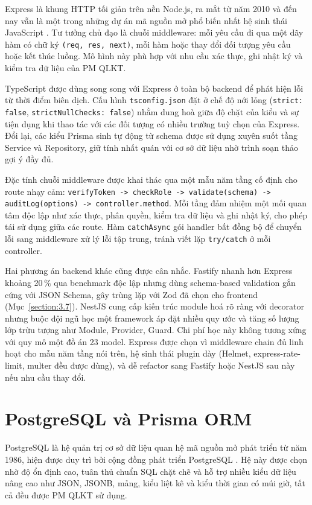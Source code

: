 \documentclass[../DoAn.tex]{subfiles}
\begin{document}
Express là khung HTTP tối giản trên nền Node.js, ra mắt từ năm 2010 và đến nay vẫn là một trong những dự án mã nguồn mở phổ biến nhất hệ sinh thái JavaScript \cite{expressdocs}. Tư tưởng chủ đạo là chuỗi middleware: mỗi yêu cầu đi qua một dãy hàm có chữ ký \texttt{(req, res, next)}, mỗi hàm hoặc thay đổi đối tượng yêu cầu hoặc kết thúc luồng. Mô hình này phù hợp với nhu cầu xác thực, ghi nhật ký và kiểm tra dữ liệu của PM QLKT.

TypeScript được dùng song song với Express ở toàn bộ backend để phát hiện lỗi từ thời điểm biên dịch. Cấu hình \texttt{tsconfig.json} đặt ở chế độ nới lỏng (\texttt{strict: false}, \texttt{strictNullChecks: false}) nhằm dung hoà giữa độ chặt của kiểu và sự tiện dụng khi thao tác với các đối tượng có nhiều trường tuỳ chọn của Express. Đổi lại, các kiểu Prisma sinh tự động từ schema được sử dụng xuyên suốt tầng Service và Repository, giữ tính nhất quán với cơ sở dữ liệu nhờ trình soạn thảo gợi ý đầy đủ.

Đặc tính chuỗi middleware được khai thác qua một mẫu năm tầng cố định cho route nhạy cảm: \texttt{verifyToken -> checkRole -> validate(schema) -> auditLog(options) -> controller.method}. Mỗi tầng đảm nhiệm một mối quan tâm độc lập như xác thực, phân quyền, kiểm tra dữ liệu và ghi nhật ký, cho phép tái sử dụng giữa các route. Hàm \texttt{catchAsync} gói handler bất đồng bộ để chuyển lỗi sang middleware xử lý lỗi tập trung, tránh viết lặp \texttt{try/catch} ở mỗi controller.

Hai phương án backend khác cũng được cân nhắc. Fastify nhanh hơn Express khoảng 20\,\% qua benchmark độc lập nhưng dùng schema-based validation gắn cứng với JSON Schema, gây trùng lặp với Zod đã chọn cho frontend (Mục~\ref{section:3.7}). NestJS cung cấp kiến trúc module hoá rõ ràng với decorator nhưng buộc đội ngũ học một framework áp đặt nhiều quy ước và tăng số lượng lớp trừu tượng như Module, Provider, Guard. Chi phí học này không tương xứng với quy mô một đồ án 23 model. Express được chọn vì middleware chain đủ linh hoạt cho mẫu năm tầng nói trên, hệ sinh thái plugin dày (Helmet, express-rate-limit, multer đều được dùng), và dễ refactor sang Fastify hoặc NestJS sau này nếu nhu cầu thay đổi.

\section{PostgreSQL và Prisma ORM}
\label{section:3.3}

PostgreSQL là hệ quản trị cơ sở dữ liệu quan hệ mã nguồn mở phát triển từ năm 1986, hiện được duy trì bởi cộng đồng phát triển PostgreSQL \cite{pgdocs}. Hệ này được chọn nhờ độ ổn định cao, tuân thủ chuẩn SQL chặt chẽ và hỗ trợ nhiều kiểu dữ liệu nâng cao như JSON, JSONB, mảng, kiểu liệt kê và kiểu thời gian có múi giờ, tất cả đều được PM QLKT sử dụng.
\end{document}
